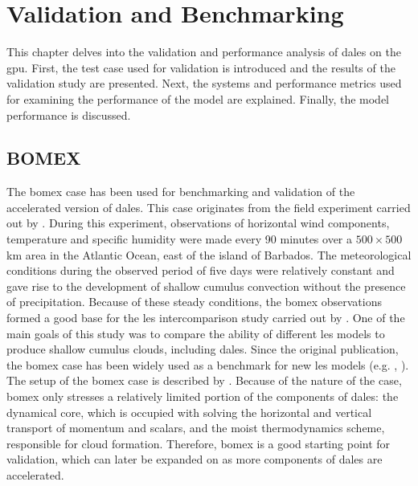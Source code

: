 \chapter{Validation and Benchmarking} \label{chap:val_bench}
This chapter delves into the validation and performance analysis of \acrshort{dales} on the \acrshort{gpu}. First, the test case used for validation is introduced and the results of the validation study are presented. Next, the systems and performance metrics used for examining the performance of the model are explained. Finally, the model performance is discussed.

\section{BOMEX}
The \acrfull{bomex} case has been used for benchmarking and validation of the accelerated version of \acrshort{dales}. This case originates from the field experiment carried out by \citet{hollandMeasurementsAtmosphericMass1973}. During this experiment, observations of horizontal wind components, temperature and specific humidity were made every 90 minutes over a $500 \times 500$ km area in the Atlantic Ocean, east of the island of Barbados. The meteorological conditions during the observed period of five days were relatively constant and gave rise to the development of shallow cumulus convection without the presence of precipitation. Because of these steady conditions, the \acrshort{bomex} observations formed a good base for the \acrshort{les} intercomparison study carried out by \citet{siebesmaLargeEddySimulation2003}. One of the main goals of this study was to compare the ability of different \acrshort{les} models to produce shallow cumulus clouds, including \acrshort{dales}. Since the original publication, the \acrshort{bomex} case has been widely used as a benchmark for new \acrshort{les} models (e.g. \citet{vanheerwaardenMicroHHComputationalFluid2017}, ). The setup of the \acrshort{bomex} case is described by \citet{siebesmaEvaluationParametricAssumptions1995}. Because of the nature of the case, \acrshort{bomex} only stresses a relatively limited portion of the components of \acrshort{dales}: the dynamical core, which is occupied with solving the horizontal and vertical transport of momentum and scalars, and the moist thermodynamics scheme, responsible for cloud formation. Therefore, \acrshort{bomex} is a good starting point for validation, which can later be expanded on as more components of \acrshort{dales} are accelerated.


